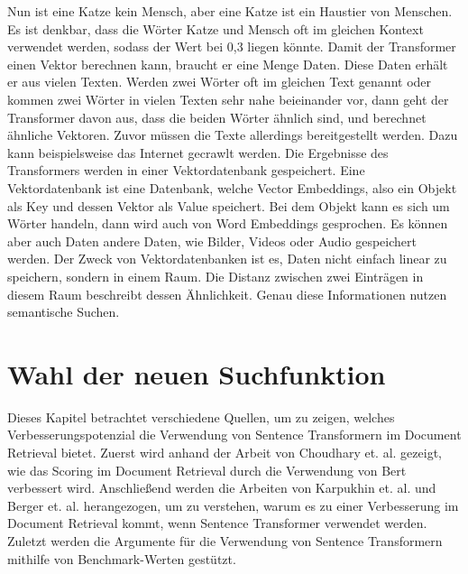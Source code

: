 Nun ist eine Katze kein Mensch, aber eine Katze ist ein Haustier von Menschen.
Es ist denkbar, dass die Wörter Katze und Mensch oft im gleichen Kontext verwendet werden, sodass der Wert bei 0,3 liegen könnte.
Damit der Transformer einen Vektor berechnen kann, braucht er eine Menge Daten.
Diese Daten erhält er aus vielen Texten.
Werden zwei Wörter oft im gleichen Text genannt oder kommen zwei Wörter in vielen Texten sehr nahe beieinander vor, dann geht der Transformer davon aus, dass die beiden Wörter ähnlich sind, und berechnet ähnliche Vektoren.
Zuvor müssen die Texte allerdings bereitgestellt werden.
Dazu kann beispielsweise das Internet gecrawlt werden.
Die Ergebnisse des Transformers werden in einer Vektordatenbank gespeichert.
Eine Vektordatenbank ist eine Datenbank, welche Vector Embeddings, also ein Objekt als Key und dessen Vektor als Value speichert.
Bei dem Objekt kann es sich um Wörter handeln, dann wird auch von Word Embeddings gesprochen.
Es können aber auch Daten andere Daten, wie Bilder, Videos oder Audio gespeichert werden.
Der Zweck von Vektordatenbanken ist es, Daten nicht einfach linear zu speichern, sondern in einem Raum.
Die Distanz zwischen zwei Einträgen in diesem Raum beschreibt dessen Ähnlichkeit.
Genau diese Informationen nutzen semantische Suchen.

\section{Wahl der neuen Suchfunktion}
Dieses Kapitel betrachtet verschiedene Quellen, um zu zeigen, welches Verbesserungspotenzial die Verwendung von Sentence Transformern im Document Retrieval bietet.
Zuerst wird anhand der Arbeit von Choudhary et. al. gezeigt, wie das Scoring im Document Retrieval durch die Verwendung von Bert verbessert wird.
Anschließend werden die Arbeiten von Karpukhin et. al. und Berger et. al. herangezogen, um zu verstehen, warum es zu einer Verbesserung im Document Retrieval kommt, wenn Sentence Transformer verwendet werden.
Zuletzt werden die Argumente für die Verwendung von Sentence Transformern mithilfe von Benchmark-Werten gestützt.\\

